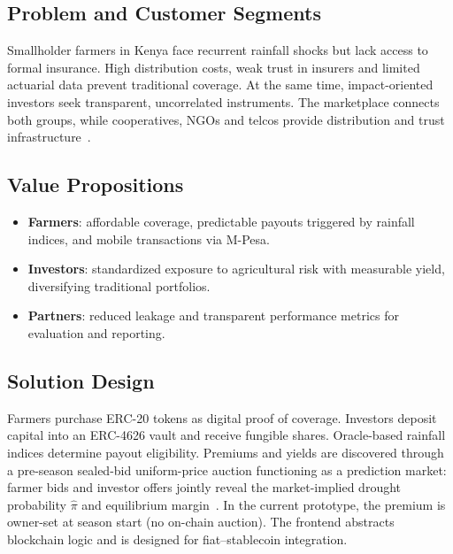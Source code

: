 \documentclass[11pt,a4paper]{article}
\begin{document}
        \subsection{Problem and Customer Segments}\label{subsec:problem-and-customer-segments}
        Smallholder farmers in Kenya face recurrent rainfall shocks but lack access to formal insurance.
        High distribution costs, weak trust in insurers and limited actuarial data prevent traditional coverage.
        At the same time, impact-oriented investors seek transparent, uncorrelated instruments.
        The marketplace connects both groups, while cooperatives, NGOs and telcos provide distribution and trust infrastructure~\parencite{cole2013barriers}.

        \subsection{Value Propositions}\label{subsec:value-propositions}
        \begin{itemize}
            \item \textbf{Farmers}: affordable coverage, predictable payouts triggered by rainfall indices, and mobile transactions via M-Pesa.
            \item \textbf{Investors}: standardized exposure to agricultural risk with measurable yield, diversifying traditional portfolios.
            \item \textbf{Partners}: reduced leakage and transparent performance metrics for evaluation and reporting.
        \end{itemize}

        \subsection{Solution Design}\label{subsec:solution-design}
        Farmers purchase ERC-20 tokens as digital proof of coverage.
        Investors deposit capital into an ERC-4626 vault and receive fungible shares.
        Oracle-based rainfall indices determine payout eligibility.
        Premiums and yields are discovered through a pre-season sealed-bid uniform-price auction functioning as a prediction market: farmer bids and investor offers jointly reveal the market-implied drought probability $\hat{\pi}$ and equilibrium margin~\parencite{hanson2003market,wolfers2004prediction}.
        In the current prototype, the premium is owner-set at season start (no on-chain auction).
        The frontend abstracts blockchain logic and is designed for fiat--stablecoin integration.
\end{document}
